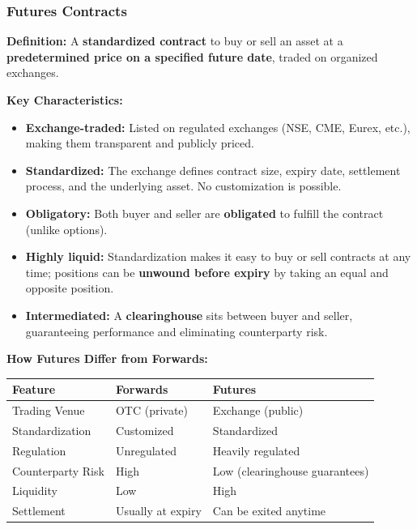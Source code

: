 \documentclass[12pt,openany]{book}
\begin{document}
\subsubsection{Futures Contracts}

\textbf{Definition:} A \textbf{standardized contract} to buy or sell an asset at a \textbf{predetermined price on a specified future date}, traded on organized exchanges.

\textbf{Key Characteristics:}
\begin{itemize}[leftmargin=*]
    \item \textbf{Exchange-traded:} Listed on regulated exchanges (NSE, CME, Eurex, etc.), making them transparent and publicly priced.
    \item \textbf{Standardized:} The exchange defines contract size, expiry date, settlement process, and the underlying asset. No customization is possible.
    \item \textbf{Obligatory:} Both buyer and seller are \textbf{obligated} to fulfill the contract (unlike options).
    \item \textbf{Highly liquid:} Standardization makes it easy to buy or sell contracts at any time; positions can be \textbf{unwound before expiry} by taking an equal and opposite position.
    \item \textbf{Intermediated:} A \textbf{clearinghouse} sits between buyer and seller, guaranteeing performance and eliminating counterparty risk.
\end{itemize}

\textbf{How Futures Differ from Forwards:}

\begin{center}
\small
\renewcommand{\arraystretch}{1.2}
\begin{tabular}{|L{0.20\textwidth}|L{0.28\textwidth}|L{0.42\textwidth}|}
\hline
\textbf{Feature} & \textbf{Forwards} & \textbf{Futures} \\ \hline
Trading Venue & OTC (private) & Exchange (public) \\ \hline
Standardization & Customized & Standardized \\ \hline
Regulation & Unregulated & Heavily regulated \\ \hline
Counterparty Risk & High & Low (clearinghouse guarantees) \\ \hline
Liquidity & Low & High \\ \hline
Settlement & Usually at expiry & Can be exited anytime \\ \hline
\end{tabular}
\end{center}
\end{document}
